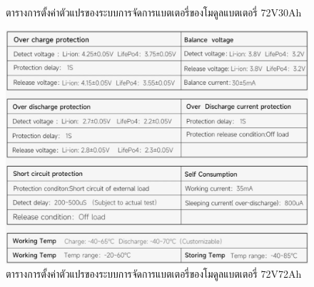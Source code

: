 \begin{center}
\begin{figure}[H]
		\centering
		\captionsetup{justification=centering,margin=2cm}
		\caption{ตารางการตั้งค่าตัวแปรของระบบการจัดการแบตเตอรี่ของโมดูลแบตเตอรี่ 72V30Ah}
		\label{fig:BMS_Setting}
	\end{figure}
	\begin{figure}[H]
		\includegraphics[width=1\linewidth]{Chapters/img/BMS_Setting2.PNG}
		\centering
		\captionsetup{justification=centering,margin=2cm}
		\caption{ตารางการตั้งค่าตัวแปรของระบบการจัดการแบตเตอรี่ของโมดูลแบตเตอรี่ 72V72Ah}
		\label{fig:BMS_Setting2}
	\end{figure}
\end{center}
